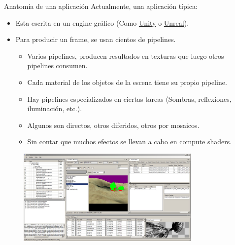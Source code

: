 \begin{frame}[allowframebreaks]{Anatomía de una aplicación}
Actualmente, una aplicación típica:
    \begin{itemize}
        \item Esta escrita en un engine gráfico (Como \href{https://unity.com/}{Unity} o \href{https://www.unrealengine.com/}{Unreal}).
        \item Para producir un frame, se usan cientos de pipelines.
        \begin{itemize}
            \item Varios pipelines, producen resultados en texturas que luego otros pipelines consumen.
            \item Cada material de los objetos de la escena tiene su propio pipeline.
            \item Hay pipelines especializados en ciertas tareas (Sombras, reflexiones, iluminación, etc.).
            \item Algunos son directos, otros diferidos, otros por mosaicos.
            \item Sin contar que muchos efectos se llevan a cabo en compute shaders.
        \end{itemize}
    \end{itemize}
    \begin{figure}[htb]
        \centering
        \includegraphics[width=0.8\textwidth]{img/functionality}
    \end{figure}
\end{frame}

